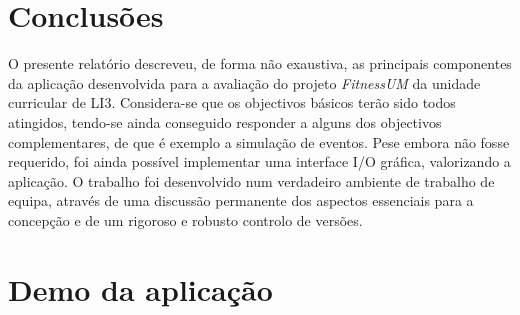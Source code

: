 \documentclass[a4paper,10pt]{report}
\begin{document}
\chapter{Conclusões}
\label{cap:concl}
O presente relatório descreveu, de forma não exaustiva, as principais componentes da aplicação desenvolvida 
para a avaliação do projeto \emph{FitnessUM} da unidade curricular de LI3. 
Considera-se que os objectivos básicos terão sido todos atingidos, tendo-se ainda conseguido responder a alguns dos objectivos 
complementares, de que é exemplo a simulação de eventos. 
Pese embora não fosse requerido, foi ainda possível implementar uma interface I/O gráfica, valorizando a aplicação.
O trabalho foi desenvolvido num verdadeiro ambiente de trabalho de equipa, através de uma discussão permanente 
dos aspectos essenciais para a concepção e de um rigoroso e robusto controlo de versões.

\newpage
\phantom{placeholder} %
\thispagestyle{empty} %



\newpage
\phantom{placeholder} %
\thispagestyle{empty} %
\appendix
\chapter{Demo da aplicação}
\label{anex:demo}
\end{document}
